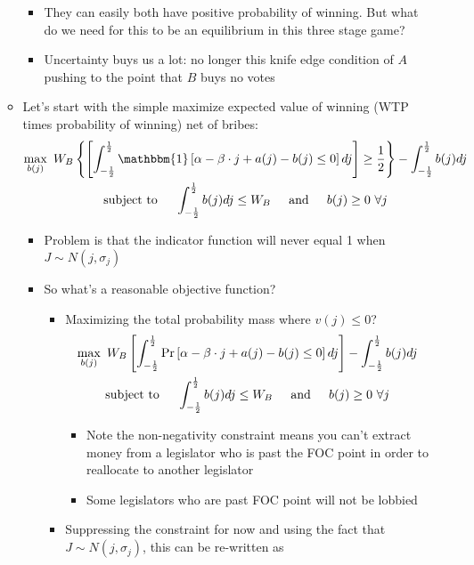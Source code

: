 \documentclass[12pt]{article}
\begin{document}
\begin{enumerate}
\begin{itemize}
\begin{itemize}
					\item They can easily both have positive probability of winning. But what do we need for this to be an equilibrium in this three stage game?
					\item Uncertainty buys us a lot: no longer this knife edge condition of $A$ pushing to the point that $B$ buys no votes
				\end{itemize}
			\item Let's start with the simple maximize expected value of winning (WTP times probability of winning) net of bribes:
						\begin{multline}
							\max_{b(j)} \ W_B\left\{ \left[ \int_{-\frac{1}{2}}^\frac{1}{2} \mathbbm{1}\left[\alpha -\beta \cdot j + a(j) - b(j) \leq 0 \right] dj \right]\geq \frac{1}{2} \right\} - \int_{-\frac{1}{2}}^\frac{1}{2} b(j) dj \\
							\text{subject to} \hskip.2in \int_{-\frac{1}{2}}^\frac{1}{2} b(j) dj \leq W_B \hskip.2in \text{and} \hskip.2in b(j)\geq0 \ \forall j
						\end{multline}
				\begin{itemize}
					\item Problem is that the indicator function will never equal 1 when $J \sim N(j,\sigma_j)$
					\item So what's a reasonable objective function? 
						\begin{itemize}
							\item Maximizing the total probability mass where $v(j) \leq 0$?
							  \begin{multline}
									\max_{b(j)} \ W_B \left[ \int_{-\frac{1}{2}}^\frac{1}{2} \Pr \left[\alpha -\beta \cdot j + a(j) - b(j) \leq 0 \right] dj \right] - \int_{-\frac{1}{2}}^\frac{1}{2} b(j) dj \\
									\text{subject to} \hskip.2in \int_{-\frac{1}{2}}^\frac{1}{2} b(j) dj \leq W_B  \hskip.2in \text{and} \hskip.2in b(j)\geq0 \ \forall j
								\end{multline}
									\begin{itemize}
										\item Note the non-negativity constraint means you can't extract money from a legislator who is past the FOC point in order to reallocate to another legislator
										\item Some legislators who are past FOC point will not be lobbied
									\end{itemize}
							\item Suppressing the constraint for now and using the fact that $J \sim N(j,\sigma_j)$, this can be re-written as

\end{itemize}
\end{itemize}
\end{itemize}
\end{enumerate}
\end{document}
